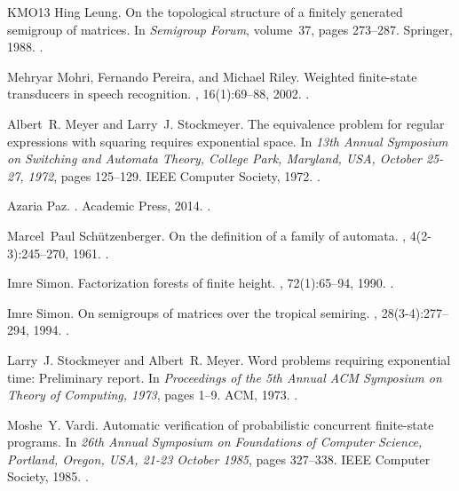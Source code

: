 \documentclass[10pt,a4paper]{amsart}
\theoremstyle{definition}
\numberwithin{equation}{section}
\theoremstyle{remark}
\theoremstyle{remark}
\begin{document}
\begin{thebibliography}{KMO{\etalchar{+}}13}
Hing Leung.
\newblock On the topological structure of a finitely generated semigroup of
  matrices.
\newblock In {\em Semigroup Forum}, volume~37, pages 273--287. Springer, 1988.
\newblock \href {https://doi.org/10.1007/BF02573140}
  {}.

Mehryar Mohri, Fernando Pereira, and Michael Riley.
\newblock Weighted finite-state transducers in speech recognition.
, 16(1):69--88, 2002.
\newblock \href {https://doi.org/10.1006/csla.2001.0184}
  {}.

Albert~R. Meyer and Larry~J. Stockmeyer.
\newblock The equivalence problem for regular expressions with squaring
  requires exponential space.
\newblock In {\em 13th Annual Symposium on Switching and Automata Theory,
  College Park, Maryland, USA, October 25-27, 1972}, pages 125--129. {IEEE}
  Computer Society, 1972.
\newblock \href {https://doi.org/10.1109/SWAT.1972.29}
  {}.

Azaria Paz.
.
\newblock Academic Press, 2014.
\newblock \href {https://doi.org/10.1016/C2013-0-11297-4}
  {}.

Marcel~Paul Sch{\"{u}}tzenberger.
\newblock On the definition of a family of automata.
, 4(2-3):245--270, 1961.
\newblock \href {https://doi.org/10.1016/S0019-9958(61)80020-X}
  {}.

Imre Simon.
\newblock Factorization forests of finite height.
, 72(1):65--94, 1990.
\newblock \href {https://doi.org/10.1016/0304-3975(90)90047-L}
  {}.

Imre Simon.
\newblock On semigroups of matrices over the tropical semiring.
, 28(3-4):277--294, 1994.
\newblock \href {https://doi.org/10.1051/ita/1994283-402771}
  {}.

Larry~J. Stockmeyer and Albert~R. Meyer.
\newblock Word problems requiring exponential time: Preliminary report.
\newblock In {\em Proceedings of the 5th Annual {ACM} Symposium on Theory of
  Computing, 1973}, pages 1--9. {ACM}, 1973.
\newblock \href {https://doi.org/10.1145/800125.804029}
  {}.

Moshe~Y. Vardi.
\newblock Automatic verification of probabilistic concurrent finite-state
  programs.
\newblock In {\em 26th Annual Symposium on Foundations of Computer Science,
  Portland, Oregon, USA, 21-23 October 1985}, pages 327--338. {IEEE} Computer
  Society, 1985.
\newblock \href {https://doi.org/10.1109/SFCS.1985.12}
  {}.

\end{thebibliography}
\end{document}
